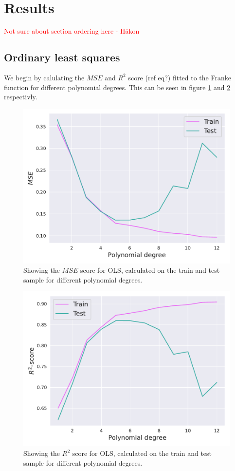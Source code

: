 \documentclass[twocolumn,english,notitlepage]{article}
\newcommand{\comment}[1]{\textcolor{red}{#1}\\}
\begin{document}
\section{Results}
    \comment{Not sure about section ordering here - Håkon}
    \subsection{Ordinary least squares}
    We begin by calulating the $MSE$ and $R^2$ score (ref eq?) fitted to the Franke function for different polynomial degrees. This can be seen in figure \ref{fig:res:OLS_mse_noresample} and \ref{fig:res:OLS_R2_noresample} respectivly. 
    \begin{figure}[H]
        \centering
        \includegraphics[width=\linewidth]{OLS_mse_noresample.pdf}
        \caption{Showing the $MSE$ score for OLS, calculated on the train and test sample for different polynomial degrees.}
        \label{fig:res:OLS_mse_noresample}
    \end{figure}

    \begin{figure}[H]
        \centering
        \includegraphics[width=\linewidth]{OLS_r2_noresample.pdf}
        \caption{Showing the $R^2$ score for OLS, calculated on the train and test sample for different polynomial degrees.}
        \label{fig:res:OLS_R2_noresample}
    \end{figure}
\end{document}
